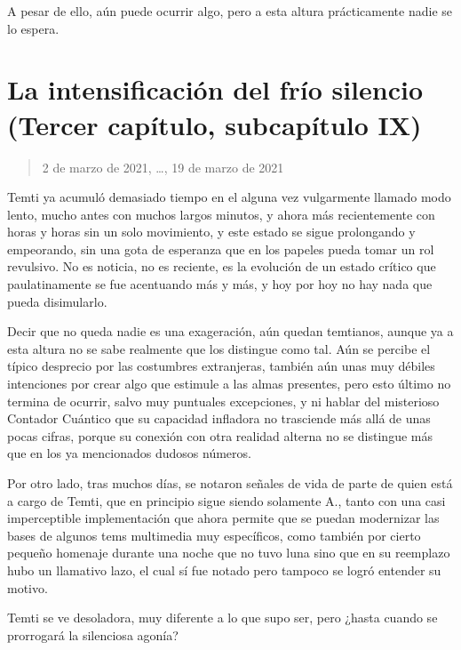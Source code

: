 \documentclass[
  spanish,
]{book}
\begin{document}
A pesar de ello, aún puede ocurrir algo, pero a esta altura prácticamente nadie se lo espera.

\hypertarget{la-intensificaciuxf3n-del-fruxedo-silencio-tercer-capuxedtulo-subcapuxedtulo-ix}{%
\section{La intensificación del frío silencio (Tercer capítulo, subcapítulo IX)}\label{la-intensificaciuxf3n-del-fruxedo-silencio-tercer-capuxedtulo-subcapuxedtulo-ix}}

\begin{quote}
2 de marzo de 2021, \ldots, 19 de marzo de 2021
\end{quote}

Temti ya acumuló demasiado tiempo en el alguna vez vulgarmente llamado modo lento, mucho antes con muchos largos minutos, y ahora más recientemente con horas y horas sin un solo movimiento, y este estado se sigue prolongando y empeorando, sin una gota de esperanza que en los papeles pueda tomar un rol revulsivo. No es noticia, no es reciente, es la evolución de un estado crítico que paulatinamente se fue acentuando más y más, y hoy por hoy no hay nada que pueda disimularlo.

Decir que no queda nadie es una exageración, aún quedan temtianos, aunque ya a esta altura no se sabe realmente que los distingue como tal. Aún se percibe el típico desprecio por las costumbres extranjeras, también aún unas muy débiles intenciones por crear algo que estimule a las almas presentes, pero esto último no termina de ocurrir, salvo muy puntuales excepciones, y ni hablar del misterioso Contador Cuántico que su capacidad infladora no trasciende más allá de unas pocas cifras, porque su conexión con otra realidad alterna no se distingue más que en los ya mencionados dudosos números.

Por otro lado, tras muchos días, se notaron señales de vida de parte de quien está a cargo de Temti, que en principio sigue siendo solamente A., tanto con una casi imperceptible implementación que ahora permite que se puedan modernizar las bases de algunos tems multimedia muy específicos, como también por cierto pequeño homenaje durante una noche que no tuvo luna sino que en su reemplazo hubo un llamativo lazo, el cual sí fue notado pero tampoco se logró entender su motivo.

Temti se ve desoladora, muy diferente a lo que supo ser, pero ¿hasta cuando se prorrogará la silenciosa agonía?
\end{document}
